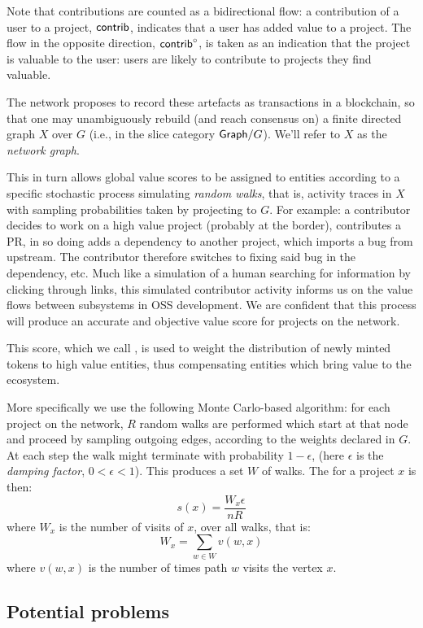 Note that contributions are counted as a bidirectional flow: a
contribution of a user to a project, $\mathsf{contrib}$, indicates that a user
has added value to a project. The flow in the opposite direction,
$\mathsf{contrib}^\circ$, is taken as an indication that the project is valuable
to the user: users are likely to contribute to projects they find
valuable.


The \oscoin{} network proposes to record these artefacts as
transactions in a blockchain, so that one may unambiguously rebuild
(and reach consensus on) a finite directed graph $X$ over $G$ (i.e.,
in the slice category $\mathsf{Graph}/G$). We'll refer to $X$ as the
\emph{network graph}.

This in turn allows global value scores to be assigned to entities
according to a specific stochastic process simulating \emph{random
  walks}, that is, activity traces in $X$ with sampling probabilities
taken by projecting to $G$. For example: a contributor decides to work
on a high value project (probably at the border), contributes a PR, in
so doing adds a dependency to another project, which imports a bug
from upstream. The contributor therefore switches to fixing said bug
in the dependency, etc. Much like a simulation of a human searching
for information by clicking through links, this simulated contributor
activity informs us on the value flows between subsystems in OSS
development. We are confident that this process will produce an
accurate and objective value score for projects on the
network. %

This score, which we call \osrank{}, is used to weight the
distribution of newly minted tokens to high value entities, thus
compensating entities which bring value to the ecosystem.

More specifically we use the following Monte Carlo-based algorithm:
for each project on the network, $R$ random walks are performed which
start at that node and proceed by sampling outgoing edges, according
to the weights declared in $G$. At each step the walk might terminate
with probability $1 - \epsilon$, (here $\epsilon$ is the \emph{damping
  factor}, $0 < \epsilon < 1$). This produces a set $W$ of walks. The
\osrank{} for a project $x$ is then:
\[
  s(x) = \frac{W_x \epsilon}{n R}
\]
where $W_x$ is the number of visits of $x$, over all walks, that is:
\[
W_x = \sum_{w \in W} v(w,x)
\]
where $v(w,x)$ is the number of times path $w$ visits the vertex $x$.

\subsection{Potential problems}

